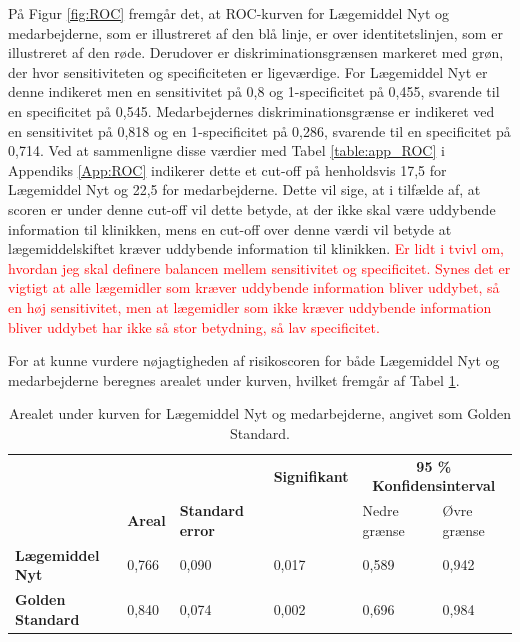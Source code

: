 På Figur \ref{fig:ROC} fremgår det, at ROC-kurven for Lægemiddel Nyt og medarbejderne, som er illustreret af den blå linje, er over identitetslinjen, som er illustreret af den røde. Derudover er diskriminationsgrænsen markeret med grøn, der hvor sensitiviteten og specificiteten er ligeværdige. For Lægemiddel Nyt er denne indikeret men en sensitivitet på 0,8 og 1-specificitet på 0,455, svarende til en specificitet på 0,545. Medarbejdernes diskriminationsgrænse er indikeret ved en sensitivitet på 0,818 og en 1-specificitet på 0,286, svarende til en specificitet på 0,714. Ved at sammenligne disse værdier med Tabel \ref{table:app_ROC} i Appendiks \ref{App:ROC} indikerer dette et cut-off på henholdsvis 17,5 for Lægemiddel Nyt og 22,5 for medarbejderne. Dette vil sige, at i tilfælde af, at scoren er under denne cut-off vil dette betyde, at der ikke skal være uddybende information til klinikken, mens en cut-off over denne værdi vil betyde at lægemiddelskiftet kræver uddybende information til klinikken. \textcolor{red}{Er lidt i tvivl om, hvordan jeg skal definere balancen mellem sensitivitet og specificitet. Synes det er vigtigt at alle lægemidler som kræver uddybende information bliver uddybet, så en høj sensitivitet, men at lægemidler som ikke kræver uddybende information bliver uddybet har ikke så stor betydning, så lav specificitet.}

For at kunne vurdere nøjagtigheden af risikoscoren for både Lægemiddel Nyt og medarbejderne beregnes arealet under kurven, hvilket fremgår af Tabel \ref{table:AUC}.

\begin{table}[H]
\caption{Arealet under kurven for Lægemiddel Nyt og medarbejderne, angivet som Golden Standard.}
\label{table:AUC}
\centering
\begin{tabular}{l|l|p{1.8cm}|l|l|l}
 \rowcolor[HTML]{C0C0C0}  &  &                         & \textbf{Signifikant} &
 \multicolumn{2}{c}{\textbf{95 \% Konfidensinterval}}  \\ 
  \rowcolor[HTML]{C0C0C0}                                                         & \textbf{Areal} &  \textbf{Standard error}                       &  & Nedre grænse      & Øvre grænse    \\ \hline
 \cellcolor[HTML]{C0C0C0}\textbf{ Lægemiddel Nyt }& 0,766 & 0,090 & 0,017 & 0,589 & 0,942  \\ \hline
 \cellcolor[HTML]{C0C0C0} \textbf{Golden Standard} & 0,840 & 0,074 & 0,002 & 0,696 & 0,984 \\
\end{tabular}
\end{table}

